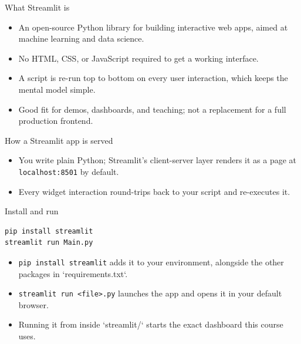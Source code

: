\begin{frame}{What Streamlit is}
\begin{itemize}
\item An open-source Python library for building interactive web apps, aimed at machine learning and data science.
\item No HTML, CSS, or JavaScript required to get a working interface.
\item A script is re-run top to bottom on every user interaction, which keeps the mental model simple.
\item Good fit for demos, dashboards, and teaching; not a replacement for a full production frontend.
\end{itemize}
\coursefooter
\end{frame}

\begin{frame}{How a Streamlit app is served}
\centering
{}
\vspace{0.6em}
\begin{itemize}
\item You write plain Python; Streamlit's client-server layer renders it as a page at \texttt{localhost:8501} by default.
\item Every widget interaction round-trips back to your script and re-executes it.
\end{itemize}
\coursefooter
\end{frame}

\begin{frame}[fragile]{Install and run}
\begin{lstlisting}[style=coursepython]
pip install streamlit
streamlit run Main.py
\end{lstlisting}
\begin{itemize}
\item \texttt{pip install streamlit} adds it to your environment, alongside the other packages in `requirements.txt`.
\item \texttt{streamlit run <file>.py} launches the app and opens it in your default browser.
\item Running it from inside `streamlit/` starts the exact dashboard this course uses.
\end{itemize}
\coursefooter
\end{frame}

